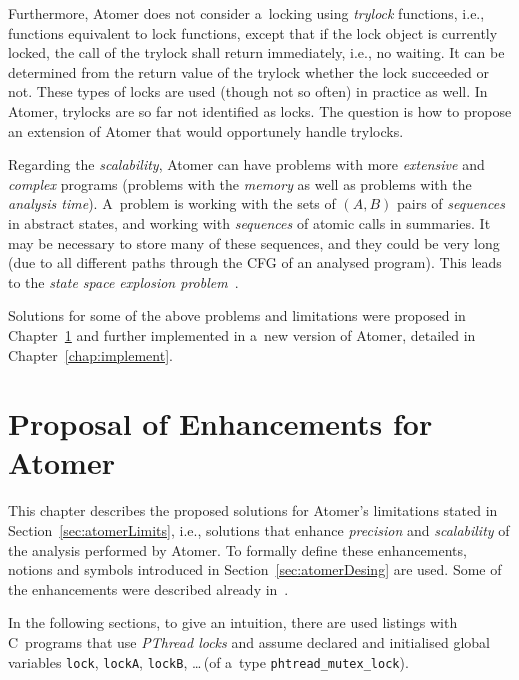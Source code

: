 Furthermore, Atomer does not consider a~locking using \emph{trylock} functions,
i.e., functions equivalent to lock functions, except that if the lock object
is currently locked, the call of the trylock shall return immediately, i.e.,
no waiting. It can be determined from the return value of the trylock whether
the lock succeeded or not. These types of locks are used (though not so often)
in practice as well. In Atomer, trylocks are so far not identified as locks.
The question is how to propose an extension of Atomer that would opportunely
handle trylocks.

Regarding the \emph{scalability}, Atomer can have problems with more
\emph{extensive} and \emph{complex} programs (problems with the \emph{memory}
as well as problems with the \emph{analysis time}). A~problem is working with
the sets of ${ (A, B) }$ pairs of \emph{sequences} in abstract states, and
working with \emph{sequences} of atomic calls in summaries. It may be
necessary to store many of these sequences, and they could be very long (due
to all different paths through the CFG of an analysed program). This leads to
the \emph{state space explosion problem}~\cite{stateExpl}.

Solutions for some of the above problems and limitations were proposed in
Chapter~\ref{chap:proposal} and further implemented in a~new version of
Atomer, detailed in Chapter~\ref{chap:implement}.



\chapter{Proposal of Enhancements for Atomer}
\label{chap:proposal}

This chapter describes the proposed solutions for Atomer's limitations
stated in Section~\ref{sec:atomerLimits}, i.e., solutions that enhance
\emph{precision} and \emph{scalability} of the analysis performed by Atomer.
To formally define these enhancements, notions and symbols introduced in
Section~\ref{sec:atomerDesing} are used. Some of the enhancements were
described already in~\cite{excel2021Harmim}.

In the following sections, to give an intuition, there are used listings with
C~programs that use \emph{PThread locks} and assume declared and initialised
global variables \texttt{lock}, \texttt{lockA}, \texttt{lockB}, \ldots\,(of
a~type \texttt{phtread\_mutex\_lock}).

